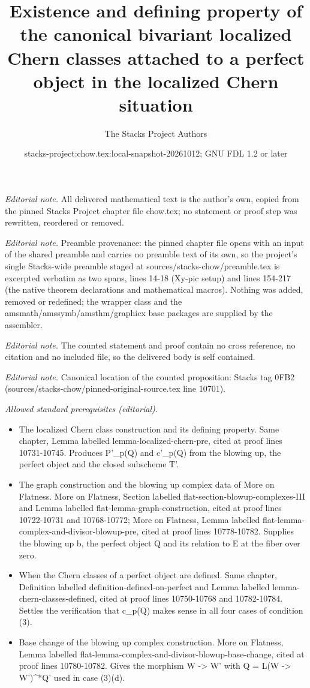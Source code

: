 \documentclass[10pt,a4paper]{amsart}
\title{Existence and defining property of the canonical bivariant localized Chern classes attached to a perfect object in the localized Chern situation}
\author{The Stacks Project Authors}
\date{stacks-project:chow.tex:local-snapshot-20261012; GNU FDL 1.2 or later}
\theoremstyle{plain}
\theoremstyle{definition}
\theoremstyle{remark}
\numberwithin{equation}{subsection}
\begin{document}
\maketitle
\noindent\textit{Editorial note.} All delivered mathematical text is the author's own, copied from the pinned Stacks Project chapter file chow.tex; no statement or proof step was rewritten, reordered or removed.\par\medskip
\noindent\textit{Editorial note.} Preamble provenance: the pinned chapter file opens with an input of the shared preamble and carries no preamble text of its own, so the project's single Stacks-wide preamble staged at sources/stacks-chow/preamble.tex is excerpted verbatim as two spans, lines 14-18 (Xy-pic setup) and lines 154-217 (the native theorem declarations and mathematical macros). Nothing was added, removed or redefined; the wrapper class and the amsmath/amssymb/amsthm/graphicx base packages are supplied by the assembler.\par\medskip
\noindent\textit{Editorial note.} The counted statement and proof contain no cross reference, no citation and no included file, so the delivered body is self contained.\par\medskip
\noindent\textit{Editorial note.} Canonical location of the counted proposition: Stacks tag 0FB2 (sources/stacks-chow/pinned-original-source.tex line 10701).\par\medskip
\noindent\textit{Allowed standard prerequisites (editorial).}\begin{itemize}
\item The localized Chern class construction and its defining property. Same chapter, Lemma labelled lemma-localized-chern-pre, cited at proof lines 10731-10745. Produces P'\_p(Q) and c'\_p(Q) from the blowing up, the perfect object and the closed subscheme T'.
\item The graph construction and the blowing up complex data of More on Flatness. More on Flatness, Section labelled flat-section-blowup-complexes-III and Lemma labelled flat-lemma-graph-construction, cited at proof lines 10722-10731 and 10768-10772; More on Flatness, Lemma labelled flat-lemma-complex-and-divisor-blowup-pre, cited at proof lines 10778-10782. Supplies the blowing up b, the perfect object Q and its relation to E at the fiber over zero.
\item When the Chern classes of a perfect object are defined. Same chapter, Definition labelled definition-defined-on-perfect and Lemma labelled lemma-chern-classes-defined, cited at proof lines 10750-10768 and 10782-10784. Settles the verification that c\_p(Q) makes sense in all four cases of condition (3).
\item Base change of the blowing up complex construction. More on Flatness, Lemma labelled flat-lemma-complex-and-divisor-blowup-base-change, cited at proof lines 10780-10782. Gives the morphism W -> W' with Q = L(W -> W')\textasciicircum{}*Q' used in case (3)(d).
\end{itemize}\medskip
\end{document}
